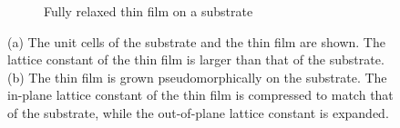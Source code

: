 \documentclass[10pt, twocolumn]{article}
\begin{document}
\begin{figure}
\begin{subfigure}{0.3\linewidth}
        \caption{Fully relaxed thin film on a substrate}
    \end{subfigure}
    \caption{(a) The unit cells of the substrate and the thin film are shown. The lattice constant 
    of the thin film is larger than that of the substrate. (b) The thin film is grown 
    pseudomorphically on the substrate. The in-plane lattice constant of the thin film is compressed 
    to match that of the substrate, while the out-of-plane lattice constant is expanded.}
\end{figure}
\end{document}
